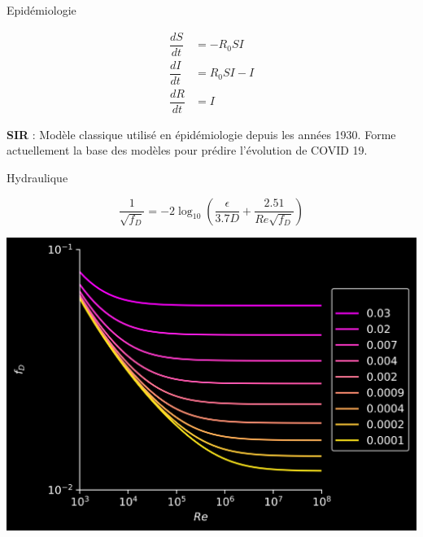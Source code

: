 \documentclass[aspectratio=169]{beamer}
\begin{document}
\begin{frame}[t, c]{Epidémiologie}{}
  \vfill
  \begin{minipage}{.28\textwidth}
    \[
    \begin{aligned}
      \dfrac{dS}{dt} & = - R_0 SI \\
      \dfrac{dI}{dt} & = R_0 SI - I \\
      \dfrac{dR}{dt} & = I
    \end{aligned}
    \]
  \end{minipage}%
  \hfill
  \begin{minipage}{.68\textwidth}
    \textbf{SIR} : Modèle classique utilisé en épidémiologie depuis les années 1930.
    Forme actuellement la base des modèles pour prédire l'évolution de COVID 19.
  \end{minipage}
  \vfill
\end{frame}

\begin{frame}
  \centering
  \vfill
  \vspace{-1cm}
  \vfill
\end{frame}

\begin{frame}[t, c]{Hydraulique}{}
  \vfill
  \begin{minipage}{.48\textwidth}
    \[
    \dfrac{1}{\sqrt{f_D}} = -2 \log_{10} \left( \dfrac{\epsilon}{3.7D} + \dfrac{2.51}{Re \sqrt{f_D}} \right)
    \]
  \end{minipage}%
  \hfill
  \begin{minipage}{.48\textwidth}
    \centering
    \includegraphics[width=\textwidth]{moody_chart}
  \end{minipage}
  \vfill
\end{frame}
\end{document}
